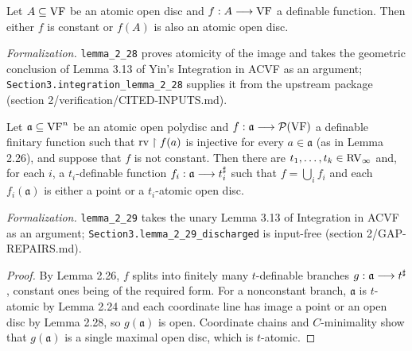 \setcounter{theorem}{27}
\begin{lemma}
\label{atomic-open-ball-open}
\leanok
{}
Let $A \subseteq \mathrm{VF}$ be an atomic open disc and $f : A \longrightarrow \mathrm{VF}$ a definable function. Then either $f$ is constant or $f(A)$ is also an atomic open disc.

\emph{Formalization.} \texttt{lemma\_2\_28} proves atomicity of the image and takes the geometric conclusion of Lemma 3.13 of Yin's Integration in ACVF as an argument; \texttt{Section3.integration\_lemma\_2\_28} supplies it from the upstream package (section 2/verification/CITED-INPUTS.md).
\end{lemma}

\setcounter{theorem}{28}
\begin{lemma}
\label{atomic-open-multidisc}
\leanok
{}
Let $\mathfrak{a} \subseteq \mathrm{VF}^n$ be an atomic open polydisc and $f : \mathfrak{a} \longrightarrow \mathcal{P}(\mathrm{VF})$ a definable finitary function such that $\operatorname{rv} \upharpoonright f(a)$ is injective for every $a \in \mathfrak{a}$ (as in Lemma 2.26), and suppose that $f$ is not constant. Then there are $t_1, \ldots, t_k \in \mathrm{RV}_\infty$ and, for each $i$, a $t_i$-definable function $f_i : \mathfrak{a} \longrightarrow t_i^\sharp$ such that $f = \bigcup_i f_i$ and each $f_i(\mathfrak{a})$ is either a point or a $t_i$-atomic open disc.

\emph{Formalization.} \texttt{lemma\_2\_29} takes the unary Lemma 3.13 of Integration in ACVF as an argument; \texttt{Section3.lemma\_2\_29\_discharged} is input-free (section 2/GAP-REPAIRS.md).
\end{lemma}

\begin{proof}
\leanok
By Lemma 2.26, $f$ splits into finitely many $t$-definable branches $g : \mathfrak{a} \longrightarrow t^\sharp$, constant ones being of the required form. For a nonconstant branch, $\mathfrak{a}$ is $t$-atomic by Lemma 2.24 and each coordinate line has image a point or an open disc by Lemma 2.28, so $g(\mathfrak{a})$ is open. Coordinate chains and $C$-minimality show that $g(\mathfrak{a})$ is a single maximal open disc, which is $t$-atomic.
\end{proof}

